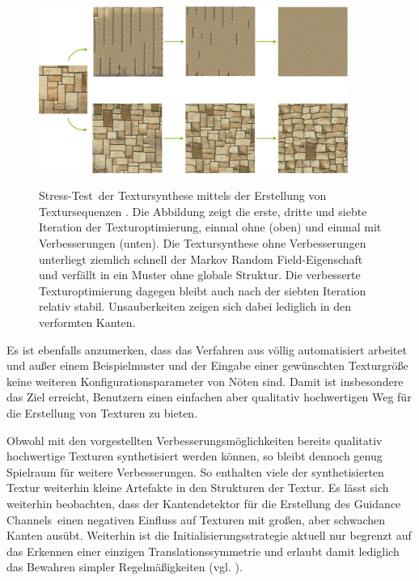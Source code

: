 \begin{figure}[h]
	\centering
	\includegraphics[width=0.9\textwidth]{images/textur-sequence-1}
	\label{textursequenzen}
	\caption{
	\glqq Stress-Test\grqq \ der Textursynthese mittels der Erstellung von Textursequenzen \cite{SelfTuning}.
	Die Abbildung zeigt die erste, dritte und siebte Iteration der Texturoptimierung, einmal ohne (oben) und einmal mit Verbesserungen (unten).
	Die Textursynthese ohne Verbesserungen unterliegt ziemlich schnell der \glqq Markov Random Field\grqq -Eigenschaft und verfällt in ein Muster ohne globale Struktur.
	Die verbesserte Texturoptimierung dagegen bleibt auch nach der siebten Iteration relativ stabil.
	Unsauberkeiten zeigen sich dabei lediglich in den verformten Kanten.
	}
\end{figure}

Es ist ebenfalls anzumerken, dass das Verfahren aus \cite{SelfTuning} völlig automatisiert arbeitet und außer einem Beispielmuster und der Eingabe einer gewünschten Texturgröße keine weiteren Konfigurationsparameter von Nöten sind.
Damit ist insbesondere das Ziel erreicht, Benutzern einen einfachen aber qualitativ hochwertigen Weg für die Erstellung von Texturen zu bieten.

Obwohl mit den vorgestellten Verbesserungsmöglichkeiten bereits qualitativ hochwertige Texturen synthetisiert werden können, so bleibt dennoch genug Spielraum für weitere Verbesserungen.
So enthalten viele der synthetisierten Textur weiterhin kleine Artefakte in den Strukturen der Textur.
Es lässt sich weiterhin beobachten, dass der Kantendetektor für die Erstellung des \glqq Guidance Channels\grqq \ einen negativen Einfluss auf Texturen mit großen, aber schwachen Kanten ausübt.
Weiterhin ist die Initialisierungsstrategie aktuell nur begrenzt auf das Erkennen einer einzigen Translationssymmetrie und erlaubt damit lediglich das Bewahren simpler Regelmäßigkeiten (vgl. \cite{SelfTuning}).